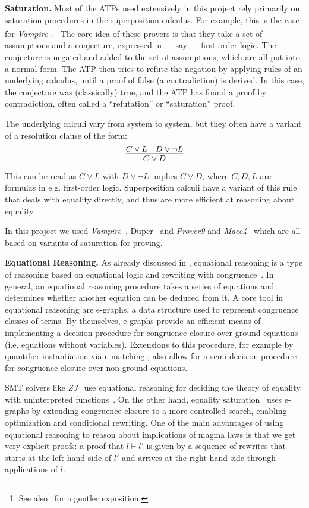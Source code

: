 \textbf{Saturation.}
Most of the ATPs used extensively in this project rely primarily on saturation procedures in the superposition calculus.
For example, this is the case for \emph{Vampire}~\cite{DBLP:conf/cav/KovacsV13}.\footnote{See also~\cite{DBLP:journals/cacm/BentkampBNTVW23} for a gentler exposition.}
The core idea of these provers is that they take a set of assumptions and a conjecture, expressed in --- say --- first-order logic.
The conjecture is negated and added to the set of assumptions, which are all put into a normal form.
The ATP then tries to refute the negation by applying rules of an underlying calculus, until a proof of false (a contradiction) is derived.
In this case, the conjecture was (classically) true, and the ATP has found a proof by contradiction, often called a ``refutation'' or ``saturation'' proof.

The underlying calculi vary from system to system, but they often have a variant of a resolution clause of the form:
\[\infer{C \lor D}{C \lor L \quad D \lor \neg L} \]
This can be read as $C \lor L$ with $D \lor \neg L$ implies $C \lor D$, where $C, D, L$ are formulas in e.g. first-order logic.
Superposition calculi have a variant of this rule that deals with equality directly, and thus are more efficient at reasoning about equality.

In this project we used \emph{Vampire}~\cite{DBLP:conf/cav/KovacsV13}, Duper~\cite{DBLP:conf/itp/CluneQBA24} and \emph{Prover9} and \emph{Mace4}~\cite{prover9-mace4} which are all based on variants of saturation for proving.

\textbf{Equational Reasoning.} As already discussed in , equational reasoning is a type of reasoning based on equational logic and rewriting with congruence~\cite{term-rewriting}.
In general, an equational reasoning procedure takes a series of equations and determines whether another equation can be deduced from it.
A core tool in equational reasoning are e-graphs, a data structure used to represent congruence classes of terms.
By themselves, e-graphs provide an efficient means of implementing a decision procedure for congruence closure over ground equations (i.e. equations without variables).
Extensions to this procedure, for example by quantifier instantiation via e-matching \cite{DBLP:conf/cade/MouraB07}, also allow for a semi-decision procedure for congruence closure over non-ground equations.

SMT solvers like \emph{Z3}~\cite{DBLP:conf/tacas/MouraB08} use equational reasoning for deciding the theory of equality with uninterpreted functions~\cite{DBLP:series/txtcs/KroeningS16,DBLP:conf/cade/MouraB07}.
On the other hand, equality saturation~\cite{DBLP:journals/pacmpl/WillseyNWFTP21} uses e-graphs by extending congruence closure to a more controlled search, enabling optimization and conditional rewriting.
One of the main advantages of using equational reasoning to reason about implications of magma laws is that we get very explicit proofs: a proof that $l \vdash l'$ is given by a sequence of rewrites that starts at the left-hand side of $l'$ and arrives at the right-hand side through applications of $l$.

